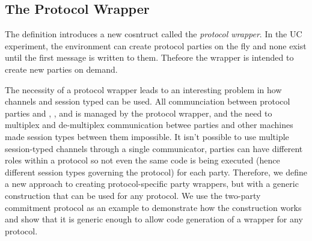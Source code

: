 \subsection{The Protocol Wrapper}
The  definition introduces a new cosntruct called the \textit{protocol wrapper}. 
In the UC experiment, the environment can create protocol parties on the fly and none exist until the first message is written to them.
Thefeore the wrapper is intended to create new parties on demand.

The necessity of a protocol wrapper leads to an interesting problem in how channels and session typed can be used.
All communciation between protocol parties and \Environment, \F, and \Adversary is managed by the protocol wrapper, and the need to multiplex and de-multiplex communication betwee parties and other machines made session types between them impossible.
It isn't possible to use multiple session-typed channels through a single communicator, parties can have different roles within a protocol so not even the same code is being executed (hence different session types governing the protocol) for each party.
Therefore, we define a new approach to creating protocol-specific party wrappers, but with a generic construction that can be used for any protocol.
We use the two-party commitment protocol as an example to demonstrate how the construction works and show that it is generic enough to allow code generation of a wrapper for any protocol.


